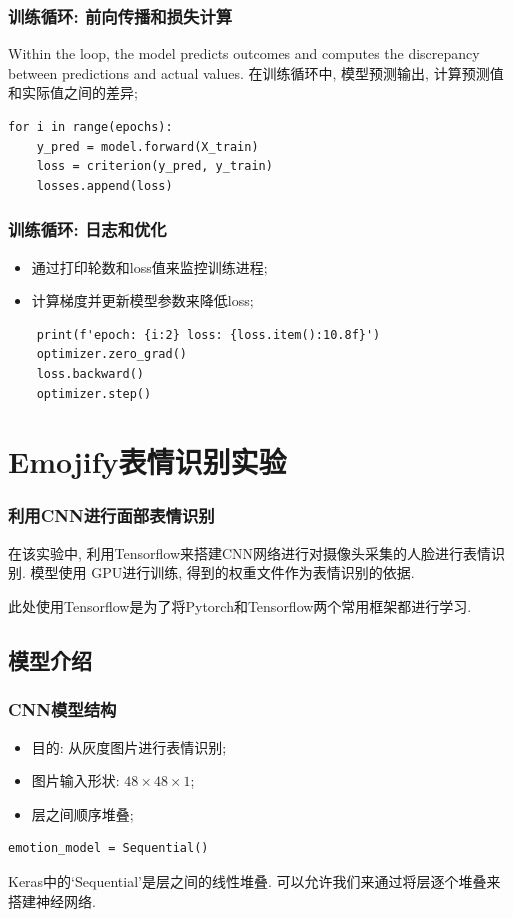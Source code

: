 \documentclass{beamer}
\begin{document}
\begin{frame}[fragile]
	\frametitle{训练循环: 前向传播和损失计算}
	Within the loop, the model predicts outcomes and computes the discrepancy between predictions and actual values.
	在训练循环中, 模型预测输出, 计算预测值和实际值之间的差异;

	\begin{verbatim}
for i in range(epochs):
    y_pred = model.forward(X_train)
    loss = criterion(y_pred, y_train)
    losses.append(loss)
\end{verbatim}
\end{frame}

\begin{frame}[fragile]
	\frametitle{训练循环: 日志和优化}
	\begin{itemize}
		\item 通过打印轮数和loss值来监控训练进程;
		\item 计算梯度并更新模型参数来降低loss;
	\end{itemize}

	\begin{verbatim}
    print(f'epoch: {i:2} loss: {loss.item():10.8f}')
    optimizer.zero_grad()
    loss.backward()
    optimizer.step()
\end{verbatim}
\end{frame}

\section{Emojify表情识别实验}
\begin{frame}
	\frametitle{利用CNN进行面部表情识别}

	在该实验中, 利用Tensorflow来搭建CNN网络进行对摄像头采集的人脸进行表情识别. 模型使用
	GPU进行训练, 得到的权重文件作为表情识别的依据.

	此处使用Tensorflow是为了将Pytorch和Tensorflow两个常用框架都进行学习.

\end{frame}

\subsection{模型介绍}
\begin{frame}[fragile]
	\frametitle{CNN模型结构}
	\begin{itemize}
		\item 目的: 从灰度图片进行表情识别;
		\item 图片输入形状: \(48 \times 48 \times 1\);
		\item 层之间顺序堆叠;
	\end{itemize}
	\begin{verbatim}
emotion_model = Sequential()
\end{verbatim}
	Keras中的`Sequential'是层之间的线性堆叠. 可以允许我们来通过将层逐个堆叠来搭建神经网络.
\end{frame}
\end{document}
